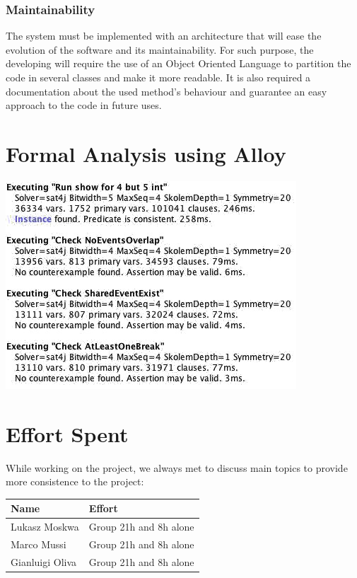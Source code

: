 \documentclass[numbers=noenddot, 12pt, a4paper, oneside]{scrbook}
\begin{document}
\subsection*{Maintainability}

The system must be implemented with an architecture that will ease the evolution of the software and its maintainability. For such purpose, the developing will require the use of an Object Oriented Language to partition the code in several classes and make it more readable. It is also required a documentation about the used method's behaviour and guarantee an easy approach to the code in future uses.


\chapter{Formal Analysis using Alloy}




\includegraphics[]{result}





\chapter{Effort Spent}

While working on the project, we always met to discuss main topics to provide more consistence to the project:\\

\begin{tabular}{|p{}|p{}|}
	\hline
	\parbox[c][6ex]{6ex}{\centering \textbf{Name}} & \textbf{Effort}
	\\
	\hline
	\parbox[c][8ex]{6ex}{\centering Lukasz Moskwa} & Group 21h and 8h alone\\
	\hline
	\parbox[c][8ex]{6ex}{\centering Marco Mussi} & Group 21h and 8h alone\\
	\hline
	\parbox[c][8ex]{6ex}{\centering Gianluigi Oliva} & Group 21h and 8h alone \\
	\hline
		
	
	
\end{tabular}
\end{document}
